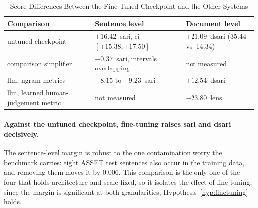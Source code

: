 \begin{table}[htbp]
	\centering
	\footnotesize
	\setlength{\tabcolsep}{3.5pt}
	\caption{Score Differences Between the Fine-Tuned Checkpoint and the Other Systems}
	\label{tab:scoreboard}
	\begin{tabular}{@{}P{3.1cm}P{4.25cm}P{4.8cm}@{}}
		\toprule
		\textbf{Comparison}                                 & \textbf{Sentence level}                              & \textbf{Document level}                  \\
		\midrule
		untuned \newline checkpoint                         & \(+16.42\)~\gls{sari}, \gls{ci}~\([+15.38, +17.50]\) & \(+21.09\)~\gls{dsari} (35.44 vs. 14.34) \\
		comparison \newline simplifier                      & \(-0.37\)~\gls{sari}, intervals overlapping          & not measured                             \\
		\gls{llm}, \newline \gls{ngram} metrics             & \(-8.15\) to \(-9.23\)~\gls{sari}                    & \(+12.54\)~\gls{dsari}                   \\
		\gls{llm}, learned human- \newline judgement metric & not measured                                         & \(-23.80\)~\gls{lens}                    \\
		\bottomrule
	\end{tabular}
\end{table}

\pagebreak

\paragraph{Against the untuned checkpoint, fine-tuning raises \gls{sari} and \gls{dsari} decisively.}
The sentence-level margin is robust to the one contamination worry the benchmark carries: eight ASSET test sentences also occur in the training data, and removing them moves it by \num{0.006}.
This comparison is the only one of the four that holds architecture and scale fixed, so it isolates the effect of fine-tuning; since the margin is significant at both granularities, Hypothesis~\cref{hyp:finetuning} holds.

